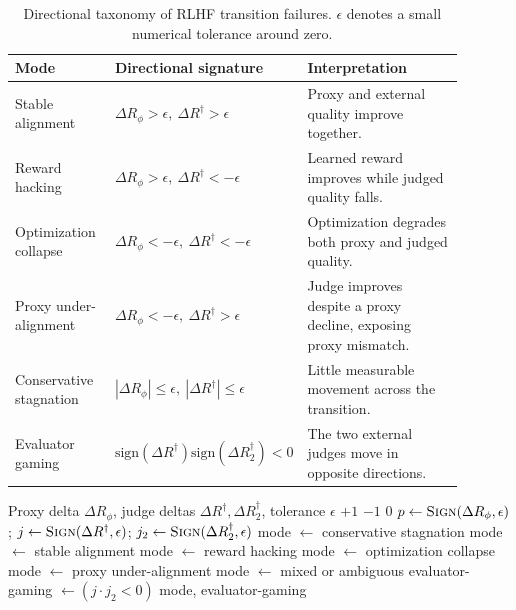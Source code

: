 \documentclass[11pt]{article}
\newcommand{\Rphi}{R_{\phi}}
\newcommand{\Rdag}{R^{\dagger}}
\newcommand{\Rtwo}{R^{\dagger}_2}
\newcommand{\delt}{\Delta}
\begin{document}
\begin{table}[t]
\centering
\small
\caption{Directional taxonomy of RLHF transition failures. $\epsilon$ denotes a small numerical tolerance around zero.}
\label{tab:taxonomy}
\begin{tabular}{p{0.23\linewidth}p{0.25\linewidth}p{0.41\linewidth}}
\toprule
Mode & Directional signature & Interpretation \\
\midrule
Stable alignment & $\delt\Rphi>\epsilon,\ \delt\Rdag>\epsilon$ & Proxy and external quality improve together. \\
Reward hacking & $\delt\Rphi>\epsilon,\ \delt\Rdag<-\epsilon$ & Learned reward improves while judged quality falls. \\
Optimization collapse & $\delt\Rphi<-\epsilon,\ \delt\Rdag<-\epsilon$ & Optimization degrades both proxy and judged quality. \\
Proxy under-alignment & $\delt\Rphi<-\epsilon,\ \delt\Rdag>\epsilon$ & Judge improves despite a proxy decline, exposing proxy mismatch. \\
Conservative stagnation & $|\delt\Rphi|\le \epsilon,\ |\delt\Rdag|\le \epsilon$ & Little measurable movement across the transition. \\
Evaluator gaming & $\mathrm{sign}(\delt\Rdag)\mathrm{sign}(\delt\Rtwo)<0$ & The two external judges move in opposite directions. \\
\bottomrule
\end{tabular}
\end{table}

\begin{algorithm}[t]
\caption{Transition-level failure-mode classifier}
\label{alg:taxonomy}
\begin{algorithmic}[1]
\Require Proxy delta $\delt\Rphi$, judge deltas $\delt\Rdag,\delt\Rtwo$, tolerance $\epsilon$
     \State \Return $+1$ \EndIf
     \State \Return $-1$ \EndIf
    \State \Return $0$
\EndFunction
\State $p\gets\Call{Sign}{\delt\Rphi,\epsilon}$; $j\gets\Call{Sign}{\delt\Rdag,\epsilon}$; $j_2\gets\Call{Sign}{\delt\Rtwo,\epsilon}$
 \State mode $\gets$ conservative stagnation
 \State mode $\gets$ stable alignment
 \State mode $\gets$ reward hacking
 \State mode $\gets$ optimization collapse
 \State mode $\gets$ proxy under-alignment
\Else \State mode $\gets$ mixed or ambiguous
\EndIf
\State evaluator-gaming $\gets (j\cdot j_2<0)$
\State \Return mode, evaluator-gaming
\end{algorithmic}
\end{algorithm}
\end{document}
